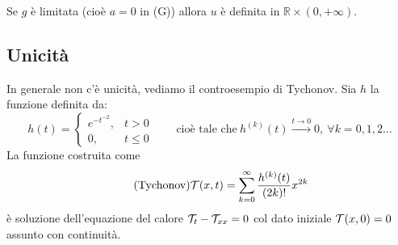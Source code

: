 \documentclass[10pt,a4paper,twoside,openright]{book}
\begin{document}

\begin{oss}
Se $g$ è limitata (cioè $a=0$ in (G)) allora $u$ è definita in $\mathbb{R} \times (0,+\infty)$.
\end{oss}
\subsection{Unicità}

In generale non c'è unicità, vediamo il controesempio di Tychonov. Sia $h$ la funzione definita da:
\begin{equation*}
h(t) =\begin{cases}
e^{-t^{-2}}, & t >0\\
0, & t\leqslant 0
\end{cases} \qquad \text{cioè tale che} \ h^{(k)}(t)\xrightarrow{t\rightarrow 0} 0,\ \forall k=0,1,2\dotsc 
\end{equation*}
La funzione costruita come
\begin{equation}
\tag{Tychonov}
\mathcal{T} (x,t) =\sum\limits ^{\infty }_{k=0}\frac{h^{(k)}(t)}{(2k) !} x^{2k}
\end{equation}
è soluzione dell'equazione del calore $\mathcal{T} _{t} -\mathcal{T} _{xx} =0$ col dato iniziale $\mathcal{T} (x,0)=0$ assunto con continuità.
\end{document}
